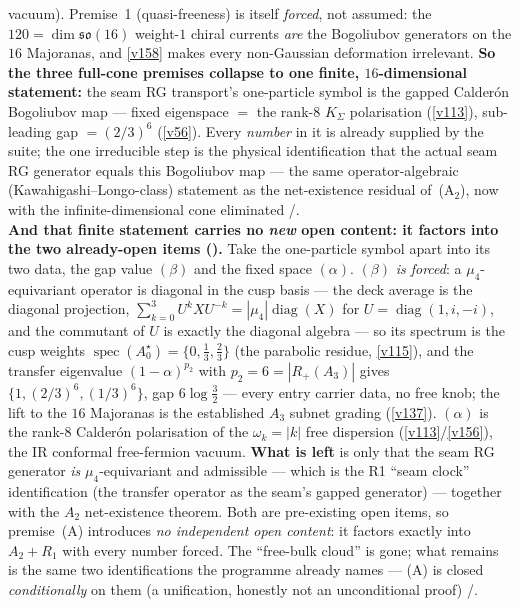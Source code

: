 \documentclass[11pt,a4paper]{article}
\begin{document}
\begin{keybox}
vacuum). Premise~1 (quasi-freeness) is itself \emph{forced}, not assumed: the $120=\dim\mathfrak{so}(16)$
weight-$1$ chiral currents \emph{are} the Bogoliubov generators on the $16$ Majoranas, and \vref{v158}
makes every non-Gaussian deformation irrelevant. \textbf{So the three full-cone premises collapse to one
finite, $16$-dimensional statement:} the seam RG transport's one-particle symbol is the gapped Calder\'on
Bogoliubov map --- fixed eigenspace $=$ the rank-$8$ $K_\Sigma$ polarisation (\vref{v113}), sub-leading gap
$=(2/3)^6$ (\vref{v56}). Every \emph{number} in it is already supplied by the suite; the one irreducible
step is the physical identification that the actual seam RG generator equals this Bogoliubov map --- the
same operator-algebraic (Kawahigashi--Longo-class) statement as the net-existence residual of~(A$_2$), now
with the infinite-dimensional cone eliminated \mE/\mO.
\smallskip\\
\noindent\textbf{And that finite statement carries no \emph{new} open content: it factors into the two
already-open items ().} Take the one-particle symbol apart
into its two data, the gap value $(\beta)$ and the fixed space $(\alpha)$. $(\beta)$ \emph{is forced}: a
$\mu_4$-equivariant operator is diagonal in the cusp basis --- the deck average is the diagonal projection,
$\sum_{k=0}^{3}U^kXU^{-k}=|\mu_4|\operatorname{diag}(X)$ for $U=\operatorname{diag}(1,i,-i)$, and the
commutant of $U$ is exactly the diagonal algebra --- so its spectrum is the cusp weights
$\operatorname{spec}(A_0^\star)=\{0,\tfrac13,\tfrac23\}$ (the parabolic residue, \vref{v115}), and the
transfer eigenvalue $(1{-}\alpha)^{p_2}$ with $p_2{=}6{=}|R_+(A_3)|$ gives $\{1,(2/3)^6,(1/3)^6\}$, gap
$6\log\tfrac32$ --- every entry carrier data, no free knob; the lift to the $16$ Majoranas is the
established $A_3$ subnet grading (\vref{v137}). $(\alpha)$ is the rank-$8$ Calder\'on polarisation of the
$\omega_k{=}|k|$ free dispersion (\vref{v113}/\vref{v156}), the IR conformal free-fermion vacuum.
\textbf{What is left} is only that the seam RG generator \emph{is} $\mu_4$-equivariant and admissible ---
which is the R1 ``seam clock'' identification (the transfer operator as the seam's gapped generator) ---
together with the $A_2$ net-existence theorem. Both are pre-existing open items, so premise~(A) introduces
\emph{no independent open content}: it factors exactly into $A_2+R_1$ with every number forced. The
``free-bulk cloud'' is gone; what remains is the same two identifications the programme already names ---
(A) is closed \emph{conditionally} on them (a unification, honestly not an unconditional proof) \mE/\mO.

\end{keybox}
\end{document}
